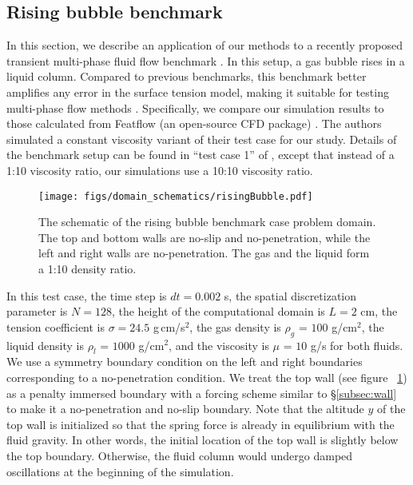 \documentclass{jfm}
\newcommand{\charles}[1]{\todo[inline,color=blue!40]{Charles: #1}}
\begin{document}
\subsection {Rising bubble benchmark} \label{subsec:rb}
In this section, we describe an application of our methods to a recently proposed transient multi-phase fluid flow benchmark \citep{turek2021numerical}. In this setup, a gas bubble rises in a liquid column. Compared to previous benchmarks, this benchmark better amplifies any error \charles{not sure what is being said here.} in the surface tension model, making it suitable for testing multi-phase flow methods \citep{turek2021numerical}. Specifically, we compare our simulation results to those calculated from Featflow (an open-source CFD package) \citep{turek2021numerical}. The authors simulated a constant viscosity variant of their test case for our study. Details of the benchmark setup can be found in ``test case 1'' of \citep{turek2021numerical}, except that instead of a 1:10 viscosity ratio, our simulations use a 10:10 viscosity ratio.  

\begin{figure}
\centering
\texttt{[image: figs/domain\_schematics/risingBubble.pdf]}
\caption{The schematic of the rising bubble benchmark case problem domain. The top and bottom walls are no-slip and no-penetration, while the left and right walls are no-penetration. The gas and the liquid form a 1:10 density ratio. }
\label{fig:rb_domain}
\end{figure}

In this test case, the time step is $dt=0.002$ s, the spatial discretization parameter is $N=128$, the height of the computational domain is $L=2$ cm, the tension coefficient is $\sigma=24.5$ g\,cm/s$^2$, the gas density is $\rho_g$ = $100$ g/cm$^2$, the liquid density is $\rho_l$ = $1000$ g/cm$^2$, and the viscosity is $\mu$ = $10$ g/s for both fluids. We use a symmetry boundary condition on the left and right boundaries corresponding to a no-penetration condition. We treat the top wall (see figure ~\ref{fig:rb_domain}) as a penalty immersed boundary with a forcing scheme similar to \S\ref{subsec:wall} to make it a no-penetration and no-slip boundary. Note that the altitude $y$ of the top wall is initialized so that the spring force is already in equilibrium with the fluid gravity. In other words, the initial location of the top wall is slightly below the top boundary. Otherwise, the fluid column would undergo damped oscillations at the beginning of the simulation. 
\end{document}
